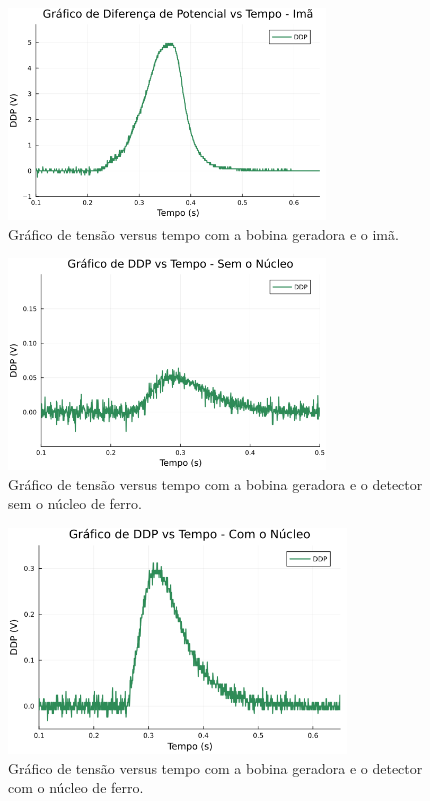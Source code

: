 \documentclass[column,brazilian,12pt,a4paper,final]{article}
\begin{document}
\begin{figure}[H]
    \centering
    \includegraphics[width=0.75\textwidth]{figuras/grafico_diferenca_potencial - 1.png}
    \caption{Gráfico de tensão versus tempo com a bobina geradora e o imã.}
    \label{fig:grafico1}
\end{figure}
\begin{figure}[H]
    \centering
    \includegraphics[width=0.75\textwidth]{figuras/grafico_diferenca_potencial - 2.png}
    \caption{Gráfico de tensão versus tempo com a bobina geradora e o detector sem o núcleo de ferro.}
    \label{fig:grafico2}
\end{figure}
\begin{figure}[H]
    \centering
    \includegraphics[width=0.8\textwidth]{figuras/grafico_diferenca_potencial - 3.png}
    \caption{Gráfico de tensão versus tempo com a bobina geradora e o detector com o núcleo de ferro.}
    \label{fig:grafico3}
\end{figure}
\end{document}
